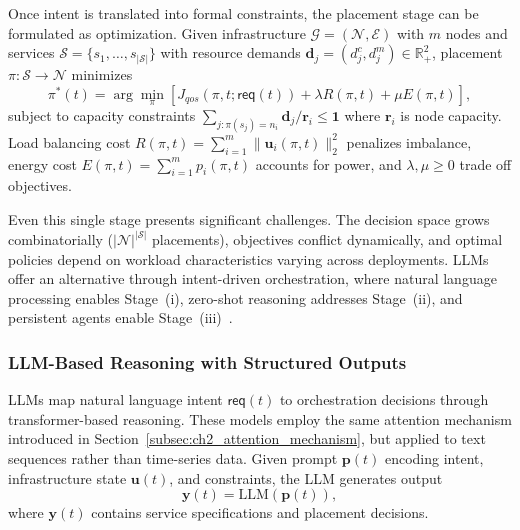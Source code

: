 Once intent is translated into formal constraints, the placement stage can be formulated as optimization. Given infrastructure $\mathcal{G} = (\mathcal{N}, \mathcal{E})$ with $m$ nodes and services $\mathcal{S} = \{s_1, \ldots, s_{|\mathcal{S}|}\}$ with resource demands $\mathbf{d}_j = (d_j^c, d_j^m) \in \mathbb{R}_+^2$, placement $\pi: \mathcal{S} \to \mathcal{N}$ minimizes
\begin{equation}
\pi^*(t) = \arg\min_\pi \left[ J_{qos}(\pi, t; \mathsf{req}(t)) + \lambda R(\pi, t) + \mu E(\pi, t) \right],
\end{equation}
subject to capacity constraints $\sum_{j: \pi(s_j) = n_i} \mathbf{d}_j / \mathbf{r}_i \leq \mathbf{1}$ where $\mathbf{r}_i$ is node capacity. Load balancing cost $R(\pi, t) = \sum_{i=1}^m \|\mathbf{u}_i(\pi, t)\|_2^2$ penalizes imbalance, energy cost $E(\pi, t) = \sum_{i=1}^m p_i(\pi, t)$ accounts for power, and $\lambda, \mu \geq 0$ trade off objectives.

Even this single stage presents significant challenges. The decision space grows combinatorially ($|\mathcal{N}|^{|\mathcal{S}|}$ placements), objectives conflict dynamically, and optimal policies depend on workload characteristics varying across deployments. \acp{LLM} offer an alternative through intent-driven orchestration, where natural language processing enables Stage~(i), zero-shot reasoning addresses Stage~(ii), and persistent agents enable Stage~(iii)~\cite{kim2025kubeteus, netllm2024}.

\subsubsection{LLM-Based Reasoning with Structured Outputs}

\acp{LLM} map natural language intent $\mathsf{req}(t)$ to orchestration decisions through transformer-based reasoning. These models employ the same attention mechanism introduced in Section~\ref{subsec:ch2_attention_mechanism}, but applied to text sequences rather than time-series data. Given prompt $\mathbf{p}(t)$ encoding intent, infrastructure state $\mathbf{u}(t)$, and constraints, the \ac{LLM} generates output
\begin{equation}
\mathbf{y}(t) = \text{LLM}(\mathbf{p}(t)),
\end{equation}
where $\mathbf{y}(t)$ contains service specifications and placement decisions.

